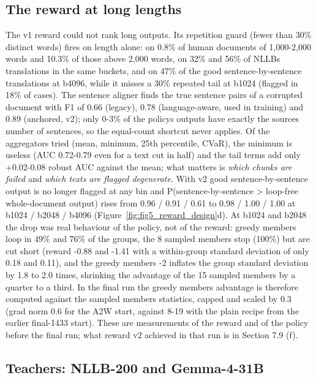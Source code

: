 \subsection{The reward at long lengths}\label{the-reward-at-long-lengths}

The v1 reward could not rank long outputs. Its repetition guard (fewer than 30\% distinct words) fires on length alone: on 0.8\% of human documents of 1,000-2,000 words and 10.3\% of those above 2,000 words, on 32\% and 56\% of NLLB\textquotesingle s translations in the same buckets, and on 47\% of the good sentence-by-sentence translations at b4096, while it misses a 30\% repeated tail at b1024 (flagged in 18\% of cases). The sentence aligner finds the true sentence pairs of a corrupted document with F1 of 0.66 (legacy), 0.78 (language-aware, used in training) and 0.89 (anchored, v2); only 0-3\% of the policy\textquotesingle s outputs have exactly the source\textquotesingle s number of sentences, so the equal-count shortcut never applies. Of the aggregators tried (mean, minimum, 25th percentile, CVaR), the minimum is useless (AUC 0.72-0.79 even for a text cut in half) and the tail terms add only +0.02-0.08 robust AUC against the mean; what matters is \emph{which chunks are failed} and \emph{which texts are flagged degenerate}. With v2 good sentence-by-sentence output is no longer flagged at any bin and P(sentence-by-sentence \textgreater{} loop-free whole-document output) rises from 0.96 / 0.91 / 0.61 to 0.98 / 1.00 / 1.00 at b1024 / b2048 / b4096 (Figure~\ref{fig:fig5_reward_design}d). At b1024 and b2048 the drop was real behaviour of the policy, not of the reward: greedy members loop in 49\% and 76\% of the groups, the 8 sampled members stop (100\%) but are cut short (reward -0.88 and -1.41 with a within-group standard deviation of only 0.18 and 0.11), and the greedy member\textquotesingle s -2 inflates the group standard deviation by 1.8 to 2.0 times, shrinking the advantage of the 15 sampled members by a quarter to a third. In the final run the greedy member\textquotesingle s advantage is therefore computed against the sampled members\textquotesingle{} statistics, capped and scaled by 0.3 (grad norm 0.6 for the A2W start, against 8-19 with the plain recipe from the earlier final-1433 start). These are measurements of the reward and of the policy before the final run; what reward v2 achieved in that run is in Section 7.9 (f).

\subsection{Teachers: NLLB-200 and Gemma-4-31B}\label{teachers-nllb-200-and-gemma-4-31b}


